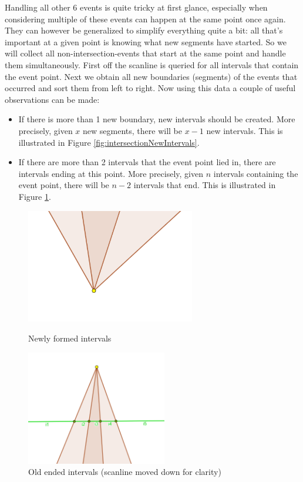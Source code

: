 \documentclass[12pt]{article}
\begin{document}
Handling all other 6 events is quite tricky at first glance, especially when considering multiple of these events can happen at the same point once again. They can however be generalized to simplify everything quite a bit: all that's important at a given point is knowing what new segments have started. So we will collect all non-intersection-events that start at the same point and handle them simultaneously. First off the scanline is queried for all intervals that contain the event point. Next we obtain all new boundaries (segments) of the events that occurred and sort them from left to right. Now using this data a couple of useful observations can be made: \begin{itemize}
    \item If there is more than 1 new boundary, new intervals should be created. More precisely, given $x$ new segments, there will be $x-1$ new intervals. This is illustrated in Figure \ref{fig:intersectionNewIntervals}.
    \item If there are more than 2 intervals that the event point lied in, there are intervals ending at this point. More precisely, given $n$ intervals containing the event point, there will be $n-2$ intervals that end. This is illustrated in Figure \ref{fig:intersectionOldIntervals}.
\end{itemize}

\begin{figure}[H]
  \centering
  \includegraphics[height=5cm]{Images/intersection_newIntervals.png}
  \caption{Newly formed intervals}
  \label{fig:intersectionNewIntervals}
\endminipage\hfill
{}
  \centering
  \includegraphics[height=5cm]{Images/intersection_oldIntervals.png}
  \caption{Old ended intervals (scanline moved down for clarity)}
  \label{fig:intersectionOldIntervals}
\endminipage
\end{figure}
\end{document}
